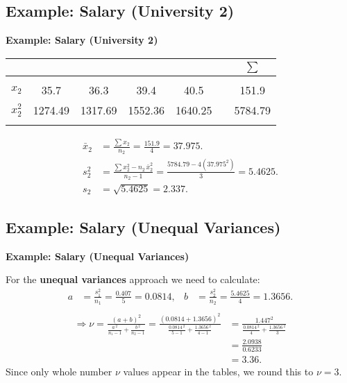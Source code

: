 \documentclass[compress]{beamer}        %
\makeatletter
\newcommand{\tcb}{\textcolor{beamer@blendedblue}}
\makeatother
\begin{document}
\subsection{Example: Salary (University 2)}
\begin{frame}{\bf \tcb{Example: Salary (University 2)}}

\begin{center}
\begin{tabular}{|c|ccccc|c|}
\multicolumn{2}{c}{}&&&& \multicolumn{1}{c}{} & \multicolumn{1}{c}{$\sum$} \\[0.1cm]
\hline
&&&&&&\\[-0.4cm]
$x_2$ & 35.7 & 36.3 & 39.4 & 40.5 & & 151.9 \\[0.2cm]
$x_2^2$ & 1274.49 & 1317.69 & 1552.36 & 1640.25 & & 5784.79 \\[0.1cm]
\hline
\multicolumn{7}{c}{}\\[-0.1cm]
\end{tabular}
\end{center}

\begin{align*}
\bar x_2 &= \frac{\sum x_2}{n_2} = \frac{151.9}{4} = 37.975. \\[0.6cm]
s_2^2 &= \frac{\sum x_2^2 - n_2 \, \bar x_2^2 }{n_2-1} = \frac{5784.79 - 4(37.975^2)}{3} = 5.4625. \\[0.6cm]
s_2 &= \sqrt{5.4625} = 2.337.
\end{align*}

\end{frame}



\subsection{Example: Salary (Unequal Variances)}
\begin{frame}{\bf \tcb{Example: Salary (Unequal Variances)}}

For the {\bf unequal variances} approach we need to calculate:
\begin{align*}
a &= \frac{s_1^2}{n_1} = \frac{0.407}{5} = 0.0814, &
b &= \frac{s_2^2}{n_2} = \frac{5.4625}{4} = 1.3656.\\[-0.5cm]
\end{align*}
\begin{align*}
\Rightarrow \nu = \frac{(a+b)^2}{\frac{a\,^2}{n_1-1}+\frac{b\,^2}{n_2-1}} = \frac{(0.0814+1.3656)^2}{\frac{0.0814\,^2}{5-1}+\frac{1.3656\,^2}{4-1}}
&= \frac{1.447^2}{\frac{0.0814\,^2}{4}+\frac{1.3656\,^2}{3}}\\[0.3cm]
&= \frac{2.0938}{0.6233}\\[0.3cm]
&= 3.36.
\end{align*}
Since only whole number $\nu$ values appear in the tables, we round this to $\nu = 3$.

\end{frame}
\end{document}
